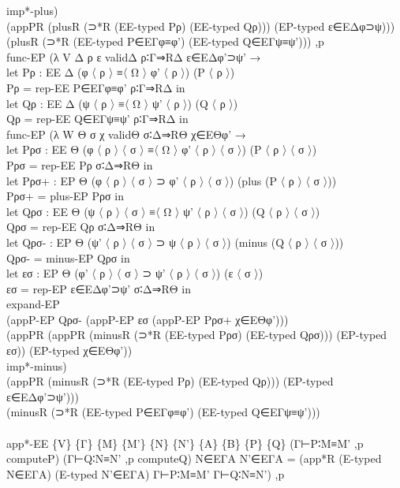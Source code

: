 {\begin{code}
{\>    imp*-plus) \<\\
\>    (appPR (plusR (⊃*R (EE-typed Pρ) (EE-typed Qρ))) (EP-typed ε∈EΔφ⊃ψ))) \<\\
\>  (plusR (⊃*R (EE-typed P∈EΓφ≡φ') (EE-typed Q∈EΓψ≡ψ'))) ,p \<\\
\>  func-EP (λ V Δ ρ ε validΔ ρ∶Γ⇒RΔ ε∈EΔφ'⊃ψ' →\<\\
\>    let Pρ : EE Δ (φ 〈 ρ 〉 ≡〈 Ω 〉 φ' 〈 ρ 〉) (P 〈 ρ 〉)\<\\
\>        Pρ = rep-EE P∈EΓφ≡φ' ρ∶Γ⇒RΔ in\<\\
\>    let Qρ : EE Δ (ψ 〈 ρ 〉 ≡〈 Ω 〉 ψ' 〈 ρ 〉) (Q 〈 ρ 〉)\<\\
\>        Qρ = rep-EE Q∈EΓψ≡ψ' ρ∶Γ⇒RΔ in\<\\
\>    func-EP (λ W Θ σ χ validΘ σ∶Δ⇒RΘ χ∈EΘφ' → \<\\
\>      let Pρσ : EE Θ (φ 〈 ρ 〉 〈 σ 〉 ≡〈 Ω 〉 φ' 〈 ρ 〉 〈 σ 〉) (P 〈 ρ 〉 〈 σ 〉)\<\\
\>          Pρσ = rep-EE Pρ σ∶Δ⇒RΘ in\<\\
\>      let Pρσ+ : EP Θ (φ 〈 ρ 〉 〈 σ 〉 ⊃ φ' 〈 ρ 〉 〈 σ 〉) (plus (P 〈 ρ 〉 〈 σ 〉))\<\\
\>          Pρσ+ = plus-EP Pρσ in\<\\
\>      let Qρσ : EE Θ (ψ 〈 ρ 〉 〈 σ 〉 ≡〈 Ω 〉 ψ' 〈 ρ 〉 〈 σ 〉) (Q 〈 ρ 〉 〈 σ 〉)\<\\
\>          Qρσ = rep-EE Qρ σ∶Δ⇒RΘ in\<\\
\>      let Qρσ- : EP Θ (ψ' 〈 ρ 〉 〈 σ 〉 ⊃ ψ 〈 ρ 〉 〈 σ 〉) (minus (Q 〈 ρ 〉 〈 σ 〉))\<\\
\>          Qρσ- = minus-EP Qρσ in\<\\
\>      let εσ : EP Θ (φ' 〈 ρ 〉 〈 σ 〉 ⊃ ψ' 〈 ρ 〉 〈 σ 〉) (ε 〈 σ 〉)\<\\
\>          εσ = rep-EP ε∈EΔφ'⊃ψ' σ∶Δ⇒RΘ in \<\\
\>      expand-EP \<\\
\>        (appP-EP Qρσ- (appP-EP εσ (appP-EP Pρσ+ χ∈EΘφ'))) \<\\
\>          (appPR (appPR (minusR (⊃*R (EE-typed Pρσ) (EE-typed Qρσ))) (EP-typed εσ)) (EP-typed χ∈EΘφ')) \<\\
\>        imp*-minus)\<\\
\>    (appPR (minusR (⊃*R (EE-typed Pρ) (EE-typed Qρ))) (EP-typed ε∈EΔφ'⊃ψ'))) \<\\
\>  (minusR (⊃*R (EE-typed P∈EΓφ≡φ') (EE-typed Q∈EΓψ≡ψ')))\<\\
\>\<\\
\>app*-EE \{V\} \{Γ\} \{M\} \{M'\} \{N\} \{N'\} \{A\} \{B\} \{P\} \{Q\} (Γ⊢P∶M≡M' ,p computeP) (Γ⊢Q∶N≡N' ,p computeQ) N∈EΓA N'∈EΓA = (app*R (E-typed N∈EΓA) (E-typed N'∈EΓA) Γ⊢P∶M≡M' Γ⊢Q∶N≡N') ,p \<\\
}
\end{code}}
